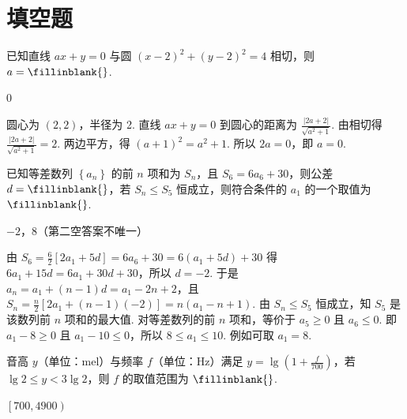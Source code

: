 \section{填空题}

\begin{problem}
已知直线 \( ax+y=0 \) 与圆 \( \left( x-2 \right)^2+\left( y-2 \right)^2=4 \) 相切，则 \( a=\fillinblank{} \).
\end{problem}

\begin{answer}
0
\end{answer}

\begin{solution}
圆心为 \( \left( 2,2 \right) \)，半径为 2. 直线 \( ax+y=0 \) 到圆心的距离为 \( \frac{\left| 2a+2 \right|}{\sqrt{a^2+1}} \). 由相切得 \( \frac{\left| 2a+2 \right|}{\sqrt{a^2+1}}=2 \). 两边平方，得 \( \left( a+1 \right)^2=a^2+1 \).
所以 \( 2a=0 \)，即 \( a=0 \).
\end{solution}

\begin{problem}
已知等差数列 \( \left\{ a_n \right\} \) 的前 \( n \) 项和为 \( S_n \)，且 \( S_6=6a_6+30 \)，则公差 \( d=\fillinblank{} \)，若 \( S_n\le S_5 \) 恒成立，则符合条件的 \( a_1 \) 的一个取值为 \(\fillinblank{} \).
\end{problem}

\begin{answer}
\(-2\)，\(8\)（第二空答案不唯一）
\end{answer}

\begin{solution}
由 \( S_6=\frac{6}{2}\left[ 2a_1+5d \right]=6a_6+30=6\left( a_1+5d \right)+30 \) 得 \( 6a_1+15d=6a_1+30d+30 \)，所以 \( d=-2 \).
于是 \( a_n=a_1+\left( n-1 \right)d=a_1-2n+2 \)，且 \( S_n=\frac{n}{2}\left[ 2a_1+\left( n-1 \right)\left( -2 \right) \right]=n\left( a_1-n+1 \right) \).
由 \( S_n\le S_5 \) 恒成立，知 \(S_5\) 是该数列前 \( n \) 项和的最大值. 对等差数列的前 \( n \) 项和，等价于 \( a_5\ge 0 \) 且 \( a_6\le 0 \). 即 \( a_1-8\ge 0 \) 且 \( a_1-10\le 0 \)，所以 \( 8\le a_1\le 10 \). 例如可取 \( a_1=8 \).
\end{solution}

\begin{problem}
音高 \( y \)（单位：mel）与频率 \( f \)（单位：Hz）满足 \( y=\lg \left( 1+\frac{f}{700} \right) \)，若 \( \lg 2\le y<3\lg 2 \)，则 \( f \) 的取值范围为 \(\fillinblank{} \).
\end{problem}

\begin{answer}
\( \left[ 700,4900 \right) \)
\end{answer}

